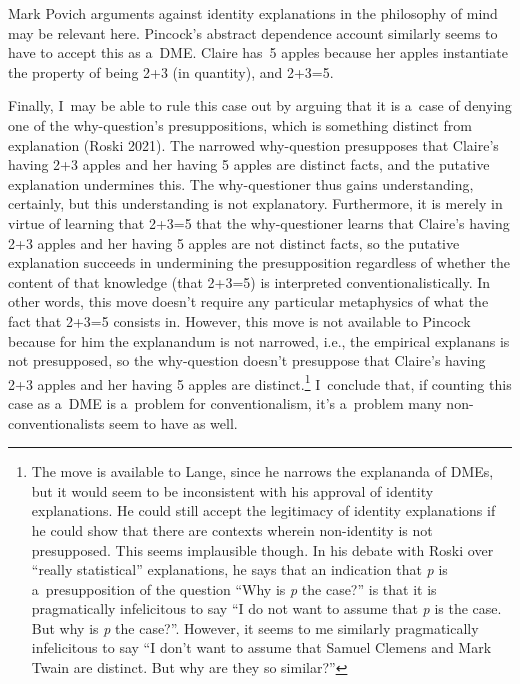 \begin{artengenv}{Mark Povich}
{%
\parencite*[][pp.104–105]{kim_philosophy_2011} %
 arguments against identity explanations in the philosophy of mind may be relevant here.}
 Pincock's
\parencite*{pincock_abstract_2015}
abstract dependence account similarly seems to have to accept this as a~DME. Claire has~5 apples because her apples instantiate the property of being 2+3 (in quantity), and 2+3=5.

Finally, I~may be able to rule this case out by arguing that it is a~case of denying one of the why-question's presuppositions, which is something distinct from explanation (Roski 2021). The narrowed why-question presupposes that Claire's having 2+3 apples and her having 5 apples are distinct facts, and the putative explanation undermines this. The why-questioner thus gains understanding, certainly, but this understanding is not explanatory. Furthermore, it is merely in virtue of learning that 2+3=5 that the why-questioner learns that Claire's having 2+3 apples and her having 5 apples are not distinct facts, so the putative explanation succeeds in undermining the presupposition regardless of whether the content of that knowledge (that 2+3=5) is interpreted conventionalistically. In other words, this move doesn't require any particular metaphysics of what the fact that 2+3=5 consists in. However, this move is not available to Pincock because for him the explanandum is not narrowed, i.e., the empirical explanans is not presupposed, so the why-question doesn't presuppose that Claire's having 2+3 apples and her having 5 apples are distinct.\footnote{The move is available to Lange, since he narrows the explananda of DMEs, but it would seem to be inconsistent with his approval of identity explanations. He could still accept the legitimacy of identity explanations if he could show that there are contexts wherein non-identity is not presupposed. This seems implausible though. In his
\parencite*[][]{lange_defense_2022} %
 debate with Roski 
\parencite*[][]{roski_defence_2021} %
 over ``really statistical'' explanations, he says that an indication that \textit{p} is a~presupposition of the question ``Why is \textit{p} the case?'' is that it is pragmatically infelicitous to say ``I do not want to assume that \textit{p} is the case. But why is \textit{p} the case?''. However, it seems to me similarly pragmatically infelicitous to say ``I don't want to assume that Samuel Clemens and Mark Twain are distinct. But why are they so similar?''} I~conclude that, if counting this case as a~DME is a~problem for conventionalism, it's a~problem many non-conventionalists seem to have as well.


\end{artengenv}
